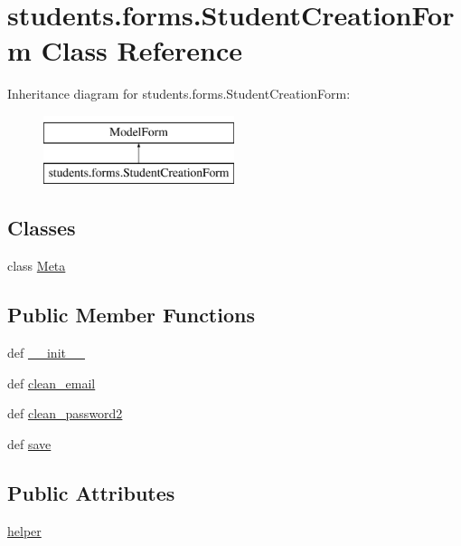 \hypertarget{classstudents_1_1forms_1_1_student_creation_form}{\section{students.\-forms.\-Student\-Creation\-Form Class Reference}
\label{classstudents_1_1forms_1_1_student_creation_form}
}
Inheritance diagram for students.\-forms.\-Student\-Creation\-Form\-:\begin{figure}[H]
\begin{center}
\leavevmode
\includegraphics[height=2.000000cm]{classstudents_1_1forms_1_1_student_creation_form}
\end{center}
\end{figure}
\subsection*{Classes}
\begin{DoxyCompactItemize}
\item 
class \hyperlink{classstudents_1_1forms_1_1_student_creation_form_1_1_meta}{Meta}
\end{DoxyCompactItemize}
\subsection*{Public Member Functions}
\begin{DoxyCompactItemize}
\item 
def \hyperlink{classstudents_1_1forms_1_1_student_creation_form_a354056c98aeeab7ca25a38c804a814b0}{\-\_\-\-\_\-init\-\_\-\-\_\-}
\item 
def \hyperlink{classstudents_1_1forms_1_1_student_creation_form_ab526befbe262db07ff883fa1d116fb2c}{clean\-\_\-email}
\item 
def \hyperlink{classstudents_1_1forms_1_1_student_creation_form_a22e51e371db82bea72497d7b7a6a2dd5}{clean\-\_\-password2}
\item 
def \hyperlink{classstudents_1_1forms_1_1_student_creation_form_a2bb73432d2899324260b1e426520ffa7}{save}
\end{DoxyCompactItemize}
\subsection*{Public Attributes}
\begin{DoxyCompactItemize}
\item 
\hyperlink{classstudents_1_1forms_1_1_student_creation_form_ae1155eb425b3d6d3367af8f8f09dc239}{helper}
\end{DoxyCompactItemize}
